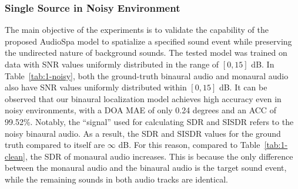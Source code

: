 \documentclass{IEEEtran}
\begin{document}
\subsubsection{Single Source in Noisy Environment}

\begin{table}[t]
    \centering
    \caption{Results on the single-source data under noisy environments with varying SNR (in dB).}
    \label{tab:1-noisy}%
  \end{table}%

The main objective of the experiments is to validate the capability of the proposed AudioSpa model to spatialize a specified sound event while preserving the undirected nature of background sounds. The tested model was trained on data with SNR values uniformly distributed in the range of $[0, 15]$ dB. In Table~\ref{tab:1-noisy}, both the ground-truth binaural audio and monaural audio also have SNR values uniformly distributed within $[0, 15]$ dB. It can be observed that our binaural localization model achieves high accuracy even in noisy environments, with a DOA MAE of only 0.24 degrees and an ACC of 99.52\%. Notably, the ``signal'' used for calculating SDR and SISDR refers to the noisy binaural audio. As a result, the SDR and SISDR values for the ground truth compared to itself are $\infty$ dB. For this reason, compared to Table~\ref{tab:1-clean}, the SDR of monaural audio increases. This is because the only difference between the monaural audio and the binaural audio is the target sound event, while the remaining sounds in both audio tracks are identical.
\end{document}
